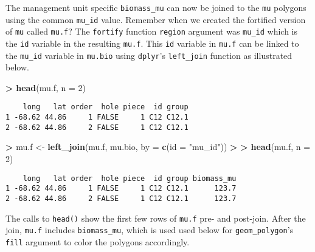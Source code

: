 \documentclass[]{krantz}
\makeatletter
\newenvironment{Shaded}{\begin{snugshade}}{\end{snugshade}}
\newcommand{\KeywordTok}[1]{\textcolor[rgb]{0.27,0.27,0.27}{\textbf{#1}}}
\newcommand{\DataTypeTok}[1]{\textcolor[rgb]{0.27,0.27,0.27}{#1}}
\newcommand{\DecValTok}[1]{\textcolor[rgb]{0.06,0.06,0.06}{#1}}
\newcommand{\StringTok}[1]{\textcolor[rgb]{0.5,0.5,0.5}{#1}}
\newcommand{\OperatorTok}[1]{\textcolor[rgb]{0.43,0.43,0.43}{\textbf{#1}}}
\newcommand{\ErrorTok}[1]{\textcolor[rgb]{0.14,0.14,0.14}{\textbf{#1}}}
\newcommand{\NormalTok}[1]{#1}
\newenvironment{kframe}{%
\medskip{}
\setlength{\fboxsep}{.8em}
 \def\at@end@of@kframe{}%
 \ifinner\ifhmode%
  \def\at@end@of@kframe{\end{minipage}}%
  \begin{minipage}{\columnwidth}%
 \fi\fi%
 \def\FrameCommand##1{\hskip\@totalleftmargin \hskip-\fboxsep
 \colorbox{shadecolor}{##1}\hskip-\fboxsep
     \hskip-\linewidth \hskip-\@totalleftmargin \hskip\columnwidth}%
 \MakeFramed {\advance\hsize-\width
   \@totalleftmargin\z@ \linewidth\hsize
   \@setminipage}}%
 {\par\unskip\endMakeFramed%
 \at@end@of@kframe}
\renewenvironment{Shaded}{\begin{kframe}}{\end{kframe}}
\theoremstyle{definition}
\theoremstyle{definition}
\theoremstyle{definition}
\theoremstyle{remark}
\makeatother
\begin{document}
The management unit specific \texttt{biomass\_mu} can now be joined to
the \texttt{mu} polygons using the common \texttt{mu\_id} value.
Remember when we created the fortified version of \texttt{mu} called
\texttt{mu.f}? The \texttt{fortify} function \texttt{region} argument
was \texttt{mu\_id} which is the \texttt{id} variable in the resulting
\texttt{mu.f}. This \texttt{id} variable in \texttt{mu.f} can be linked
to the \texttt{mu\_id} variable in \texttt{mu.bio} using
\texttt{dplyr}'s \texttt{left\_join} function as illustrated below.

\begin{Shaded}
\begin{Highlighting}[]
\OperatorTok{>}\StringTok{ }\KeywordTok{head}\NormalTok{(mu.f, }\DataTypeTok{n =} \DecValTok{2}\NormalTok{)}
\end{Highlighting}
\end{Shaded}

\begin{verbatim}
    long   lat order  hole piece  id group
1 -68.62 44.86     1 FALSE     1 C12 C12.1
2 -68.62 44.86     2 FALSE     1 C12 C12.1
\end{verbatim}

\begin{Shaded}
\begin{Highlighting}[]
\OperatorTok{>}\StringTok{ }\NormalTok{mu.f <-}\StringTok{ }\KeywordTok{left_join}\NormalTok{(mu.f, mu.bio, }\DataTypeTok{by =} \KeywordTok{c}\NormalTok{(}\DataTypeTok{id =} \StringTok{"mu_id"}\NormalTok{))}
\OperatorTok{>}\StringTok{ }
\ErrorTok{>}\StringTok{ }\KeywordTok{head}\NormalTok{(mu.f, }\DataTypeTok{n =} \DecValTok{2}\NormalTok{)}
\end{Highlighting}
\end{Shaded}

\begin{verbatim}
    long   lat order  hole piece  id group biomass_mu
1 -68.62 44.86     1 FALSE     1 C12 C12.1      123.7
2 -68.62 44.86     2 FALSE     1 C12 C12.1      123.7
\end{verbatim}

The calls to \texttt{head()} show the first few rows of \texttt{mu.f}
pre- and post-join. After the join, \texttt{mu.f} includes
\texttt{biomass\_mu}, which is used used below for
\texttt{geom\_polygon}'s \texttt{fill} argument to color the polygons
accordingly.
\end{document}
